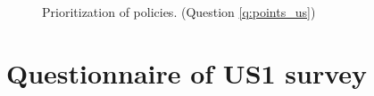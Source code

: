 \begin{figure}[h!] %
    \caption{Prioritization of policies. (Question \ref{q:points_us})}\label{fig:points_us}
\end{figure}



\clearpage
\section{Questionnaire of US1 %
survey}\label{app:questionnaire_US1}

